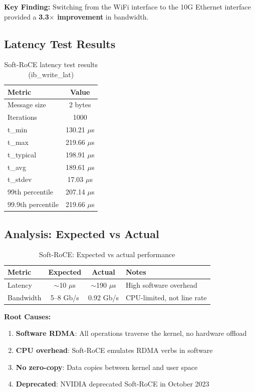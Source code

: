 \documentclass[10pt,letterpaper]{article}
\begin{document}
\textbf{Key Finding:} Switching from the WiFi interface to the 10G Ethernet interface provided a \textbf{3.3$\times$ improvement} in bandwidth.

\subsection{Latency Test Results}

\begin{table}[H]
\centering
\small
\begin{tabular}{@{}lc@{}}
\toprule
\textbf{Metric} & \textbf{Value} \\
\midrule
Message size & 2 bytes \\
Iterations & 1000 \\
t\_min & 130.21 $\mu$s \\
t\_max & 219.66 $\mu$s \\
t\_typical & 198.91 $\mu$s \\
t\_avg & 189.61 $\mu$s \\
t\_stdev & 17.03 $\mu$s \\
99th percentile & 207.14 $\mu$s \\
99.9th percentile & 219.66 $\mu$s \\
\bottomrule
\end{tabular}
\caption{Soft-RoCE latency test results (ib\_write\_lat)}
\end{table}

\subsection{Analysis: Expected vs Actual}

\begin{table}[H]
\centering
\small
\begin{tabular}{@{}lccp{5cm}@{}}
\toprule
\textbf{Metric} & \textbf{Expected} & \textbf{Actual} & \textbf{Notes} \\
\midrule
Latency & $\sim$10 $\mu$s & $\sim$190 $\mu$s & High software overhead \\
Bandwidth & 5--8 Gb/s & 0.92 Gb/s & CPU-limited, not line rate \\
\bottomrule
\end{tabular}
\caption{Soft-RoCE: Expected vs actual performance}
\end{table}

\textbf{Root Causes:}
\begin{enumerate}[noitemsep]
    \item \textbf{Software RDMA}: All operations traverse the kernel, no hardware offload
    \item \textbf{CPU overhead}: Soft-RoCE emulates RDMA verbs in software
    \item \textbf{No zero-copy}: Data copies between kernel and user space
    \item \textbf{Deprecated}: NVIDIA deprecated Soft-RoCE in October 2023
\end{enumerate}
\end{document}
